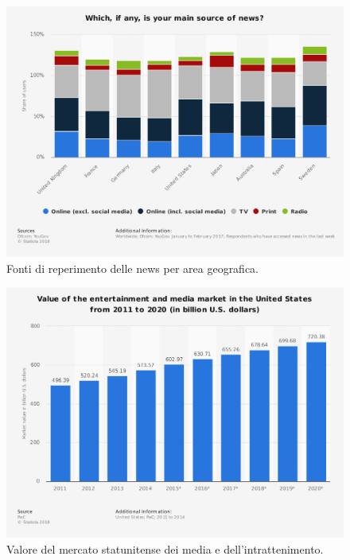 \documentclass[a4paper, 11pt]{article}
\begin{document}
\newpage\null\vfill
\begin{figure}[h]
\includegraphics[width=\textwidth]{images/vicenewssource.png}
\caption{Fonti di reperimento delle news per area geografica.}
\label{fig:source}
\end{figure}
\vfill

\newpage\null\vfill
\begin{figure}[h]
\includegraphics[width=\textwidth]{images/vicemarketvalue.png}
\caption{Valore del mercato statunitense dei media e dell'intrattenimento.}
\label{fig:marketvalue}
\end{figure}
\vfill
\end{document}

